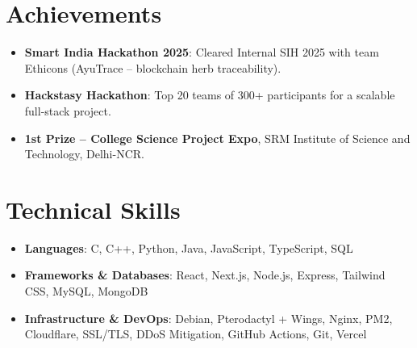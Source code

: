 \documentclass[11pt,letterpaper]{article}
\begin{document}
\section*{Achievements}
\begin{itemize}
\item \textbf{Smart India Hackathon 2025}: Cleared Internal SIH 2025 with team Ethicons (AyuTrace -- blockchain herb traceability).
\item \textbf{Hackstasy Hackathon}: Top 20 teams of 300+ participants for a scalable full-stack project.
\item \textbf{1st Prize -- College Science Project Expo}, SRM Institute of Science and Technology, Delhi-NCR.
\end{itemize}

\enlargethispage{15pt}
\section*{Technical Skills}
\begin{itemize}
\item \textbf{Languages}: C, C++, Python, Java, JavaScript, TypeScript, SQL
\item \textbf{Frameworks \& Databases}: React, Next.js, Node.js, Express, Tailwind CSS, MySQL, MongoDB
\item \textbf{Infrastructure \& DevOps}: Debian, Pterodactyl + Wings, Nginx, PM2, Cloudflare, SSL/TLS, DDoS Mitigation, GitHub Actions, Git, Vercel
\end{itemize}
\end{document}
